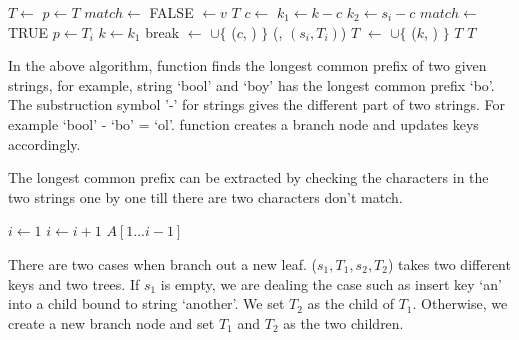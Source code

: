 \documentclass{article}
\begin{document}
\begin{algorithmic}[1]
   \State $T \gets$ 
  \EndIf
  \State $p \gets T$
  \Loop
    \State $match \gets$ FALSE
        \State {} $\gets v$
        \State \Return $T$
      \EndIf
      \State $c \gets$ 
      \State $k_1 \gets k - c$
      \State $k_2 \gets s_i - c$
        \State $match \gets$ TRUE
         
          \State $p \gets T_i$
          \State $k \gets k_1$
          \State break
        \Else {}
          \State {} $\gets$  $\cup \{$ ($c$, ) $\}$
          \State {}(, $(s_i, T_i)$)
          \State \Return $T$
        \EndIf
      \EndIf
    \EndFor
     
      \State {} $\gets$  $\cup \{$ ($k$, ) $\}$
      \State \Return $T$
    \EndIf
  \EndLoop
  \State \Return $T$
\EndFunction
\end{algorithmic}

In the above algorithm,  function finds the longest
common prefix of two given strings, for example, string `bool' and `boy'
has the longest common prefix `bo'. The substruction symbol '-' for
strings gives the different part of two strings. For example `bool' - `bo' = `ol'.  function creates a branch node
and updates keys accordingly.

The longest common prefix can be extracted by checking the characters in the two
strings one by one till there are two characters don't match.

\begin{algorithmic}[1]
  \State $i \gets 1 $
    \State $i \gets i + 1$
  \EndWhile
  \State \Return $A[1...i-1]$
\EndFunction
\end{algorithmic}

There are two cases when branch out a new leaf. ($s_1, T_1, s_2, T_2$)
takes two different keys and two trees. If $s_1$ is empty, we are
dealing the case such as insert key `an' into a child bound to
string `another'. We set $T_2$ as the child of $T_1$. Otherwise,
we create a new branch node and set $T_1$ and $T_2$ as the two children.
\end{document}
